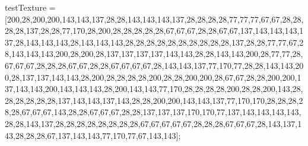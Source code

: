 

testTexture = [200,28,200,200,143,143,137,28,28,143,143,143,137,28,28,28,28,77,77,77,67,67,28,28,28,28,137,28,28,77,170,28,200,28,28,28,28,28,67,67,67,28,28,67,67,137,143,143,143,137,28,143,143,143,28,143,143,143,28,28,28,28,28,28,28,28,28,28,137,28,28,77,77,67,28,143,143,143,200,28,200,28,137,137,137,137,143,143,28,28,143,143,200,28,77,77,28,67,67,67,28,28,28,67,67,28,28,67,67,67,67,28,143,143,137,77,170,77,28,28,143,143,200,28,137,137,143,143,28,200,28,28,28,28,200,28,28,200,200,28,67,67,28,28,200,200,137,143,143,200,143,143,143,28,200,143,143,77,170,28,28,28,28,200,28,28,200,143,28,28,28,28,28,28,137,143,143,137,143,28,28,200,200,143,143,137,77,170,170,28,28,28,28,28,67,67,67,143,28,28,67,67,67,28,28,137,137,137,170,170,77,137,143,143,143,143,28,28,143,137,28,28,28,28,28,28,28,28,67,67,67,67,67,28,28,28,67,67,67,28,143,137,143,28,28,28,67,137,143,143,77,170,77,67,143,143];

